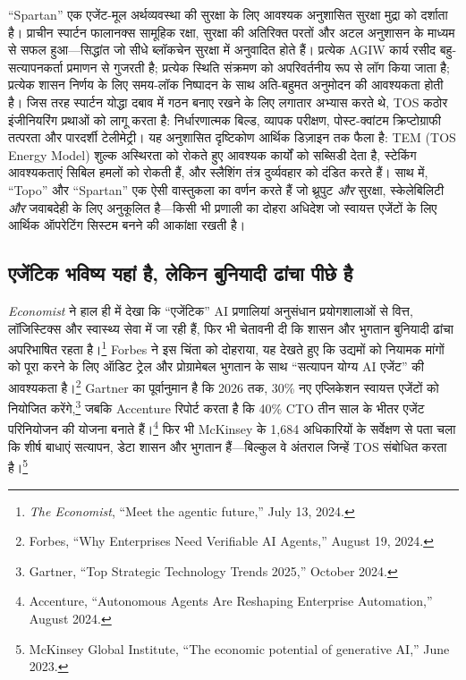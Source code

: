 \documentclass[11pt]{article}
\begin{document}
``Spartan'' एक एजेंट-मूल अर्थव्यवस्था की सुरक्षा के लिए आवश्यक अनुशासित सुरक्षा मुद्रा को दर्शाता है। प्राचीन स्पार्टन फालानक्स सामूहिक रक्षा, सुरक्षा की अतिरिक्त परतों और अटल अनुशासन के माध्यम से सफल हुआ---सिद्धांत जो सीधे ब्लॉकचेन सुरक्षा में अनुवादित होते हैं। प्रत्येक AGIW कार्य रसीद बहु-सत्यापनकर्ता प्रमाणन से गुजरती है; प्रत्येक स्थिति संक्रमण को अपरिवर्तनीय रूप से लॉग किया जाता है; प्रत्येक शासन निर्णय के लिए समय-लॉक निष्पादन के साथ अति-बहुमत अनुमोदन की आवश्यकता होती है। जिस तरह स्पार्टन योद्धा दबाव में गठन बनाए रखने के लिए लगातार अभ्यास करते थे, TOS कठोर इंजीनियरिंग प्रथाओं को लागू करता है: निर्धारणात्मक बिल्ड, व्यापक परीक्षण, पोस्ट-क्वांटम क्रिप्टोग्राफी तत्परता और पारदर्शी टेलीमेट्री। यह अनुशासित दृष्टिकोण आर्थिक डिज़ाइन तक फैला है: TEM (TOS Energy Model) शुल्क अस्थिरता को रोकते हुए आवश्यक कार्यों को सब्सिडी देता है, स्टेकिंग आवश्यकताएं सिबिल हमलों को रोकती हैं, और स्लैशिंग तंत्र दुर्व्यवहार को दंडित करते हैं। साथ में, ``Topo'' और ``Spartan'' एक ऐसी वास्तुकला का वर्णन करते हैं जो थ्रूपुट \emph{और} सुरक्षा, स्केलेबिलिटी \emph{और} जवाबदेही के लिए अनुकूलित है---किसी भी प्रणाली का दोहरा अधिदेश जो स्वायत्त एजेंटों के लिए आर्थिक ऑपरेटिंग सिस्टम बनने की आकांक्षा रखती है।

\subsection{एजेंटिक भविष्य यहां है, लेकिन बुनियादी ढांचा पीछे है}
\emph{Economist} ने हाल ही में देखा कि ``एजेंटिक'' AI प्रणालियां अनुसंधान प्रयोगशालाओं से वित्त, लॉजिस्टिक्स और स्वास्थ्य सेवा में जा रही हैं, फिर भी चेतावनी दी कि शासन और भुगतान बुनियादी ढांचा अपरिभाषित रहता है।\footnote{\emph{The Economist}, ``Meet the agentic future,'' July 13, 2024.} Forbes ने इस चिंता को दोहराया, यह देखते हुए कि उद्यमों को नियामक मांगों को पूरा करने के लिए ऑडिट ट्रेल और प्रोग्रामेबल भुगतान के साथ ``सत्यापन योग्य AI एजेंट'' की आवश्यकता है।\footnote{Forbes, ``Why Enterprises Need Verifiable AI Agents,'' August 19, 2024.} Gartner का पूर्वानुमान है कि 2026 तक, 30\% नए एप्लिकेशन स्वायत्त एजेंटों को नियोजित करेंगे,\footnote{Gartner, ``Top Strategic Technology Trends 2025,'' October 2024.} जबकि Accenture रिपोर्ट करता है कि 40\% CTO तीन साल के भीतर एजेंट परिनियोजन की योजना बनाते हैं।\footnote{Accenture, ``Autonomous Agents Are Reshaping Enterprise Automation,'' August 2024.} फिर भी McKinsey के 1,684 अधिकारियों के सर्वेक्षण से पता चला कि शीर्ष बाधाएं सत्यापन, डेटा शासन और भुगतान हैं---बिल्कुल वे अंतराल जिन्हें TOS संबोधित करता है।\footnote{McKinsey Global Institute, ``The economic potential of generative AI,'' June 2023.}
\end{document}
